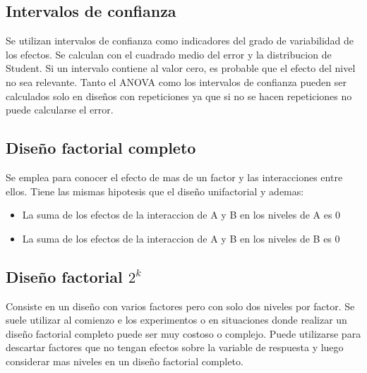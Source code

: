 \documentclass[a4paper]{article}
\begin{document}
\subsection*{Intervalos de confianza}
Se utilizan intervalos de confianza como indicadores del grado de variabilidad de los efectos.
Se calculan con el cuadrado medio del error y la distribucion de Student. Si un intervalo 
contiene al valor cero, es probable que el efecto del nivel no sea relevante.
Tanto el ANOVA como los intervalos de confianza pueden ser calculados solo en diseños con
repeticiones ya que si no se hacen repeticiones no puede calcularse el error.

\subsection*{Diseño factorial completo}
Se emplea para conocer el efecto de mas de un factor y las interacciones entre ellos.
Tiene las mismas hipotesis que el diseño unifactorial y ademas:
\begin{itemize}
    \item La suma de los efectos de la interaccion de A y B en los niveles de A es 0
    \item La suma de los efectos de la interaccion de A y B en los niveles de B es 0
\end{itemize}

\subsection*{Diseño factorial $2^k$}
Consiste en un diseño con varios factores pero con solo dos niveles por factor. 
Se suele utilizar al comienzo e los experimentos o en situaciones donde realizar un 
diseño factorial completo puede ser muy costoso o complejo. Puede utilizarse para descartar 
factores que no tengan efectos sobre la variable de respuesta y luego considerar mas niveles 
en un diseño factorial completo.
\end{document}
